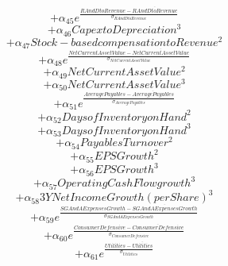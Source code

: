\documentclass{article}
\begin{document}
\[+\alpha_{45}e^{\frac{RAndD to Revenue - \overline{RAndD to Revenue}}{\sigma_{RAndD to Revenue}}}\]
\[+\alpha_{46}Capex to Depreciation^3\]
\[+\alpha_{47}Stock-based compensation to Revenue^2\]
\[+\alpha_{48}e^{\frac{Net Current Asset Value - \overline{Net Current Asset Value}}{\sigma_{Net Current Asset Value}}}\]
\[+\alpha_{49}Net Current Asset Value^2\]
\[+\alpha_{50}Net Current Asset Value^3\]
\[+\alpha_{51}e^{\frac{Average Payables - \overline{Average Payables}}{\sigma_{Average Payables}}}\]
\[+\alpha_{52}Days of Inventory on Hand^2\]
\[+\alpha_{53}Days of Inventory on Hand^3\]
\[+\alpha_{54}Payables Turnover^2\]
\[+\alpha_{55}EPS Growth^2\]
\[+\alpha_{56}EPS Growth^3\]
\[+\alpha_{57}Operating Cash Flow growth^3\]
\[+\alpha_{58}3Y Net Income Growth (per Share)^3\]
\[+\alpha_{59}e^{\frac{SGAndA Expenses Growth - \overline{SGAndA Expenses Growth}}{\sigma_{SGAndA Expenses Growth}}}\]
\[+\alpha_{60}e^{\frac{Consumer Defensive - \overline{Consumer Defensive}}{\sigma_{Consumer Defensive}}}\]
\[+\alpha_{61}e^{\frac{Utilities - \overline{Utilities}}{\sigma_{Utilities}}}\]
\end{document}
